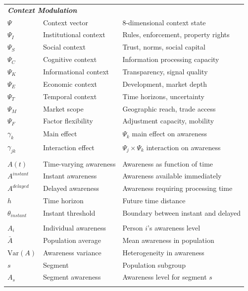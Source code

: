 \begin{longtable}{p{2.5cm}p{4cm}p{7cm}}
\multicolumn{3}{l}{\textit{\textbf{Context Modulation}}} \\
$\Psi$ & Context vector & 8-dimensional context state \\
$\Psi_I$ & Institutional context & Rules, enforcement, property rights \\
$\Psi_S$ & Social context & Trust, norms, social capital \\
$\Psi_C$ & Cognitive context & Information processing capacity \\
$\Psi_K$ & Informational context & Transparency, signal quality \\
$\Psi_E$ & Economic context & Development, market depth \\
$\Psi_T$ & Temporal context & Time horizons, uncertainty \\
$\Psi_M$ & Market scope & Geographic reach, trade access \\
$\Psi_F$ & Factor flexibility & Adjustment capacity, mobility \\
$\gamma_k$ & Main effect & $\Psi_k$ main effect on awareness \\
$\gamma_{jk}$ & Interaction effect & $\Psi_j \times \Psi_k$ interaction on awareness \\
\addlinespace

\multicolumn{3}{l}{\textit{\textbf{Dynamics}}} \\
$A(t)$ & Time-varying awareness & Awareness as function of time \\
$A^{instant}$ & Instant awareness & Awareness available immediately \\
$A^{delayed}$ & Delayed awareness & Awareness requiring processing time \\
$h$ & Time horizon & Future time distance \\
$\theta_{instant}$ & Instant threshold & Boundary between instant and delayed \\
\addlinespace

\multicolumn{3}{l}{\textit{\textbf{Heterogeneity}}} \\
$A_i$ & Individual awareness & Person $i$'s awareness level \\
$\bar{A}$ & Population average & Mean awareness in population \\
$\text{Var}(A)$ & Awareness variance & Heterogeneity in awareness \\
$s$ & Segment & Population subgroup \\
$A_s$ & Segment awareness & Awareness level for segment $s$ \\
\addlinespace


\end{longtable}
